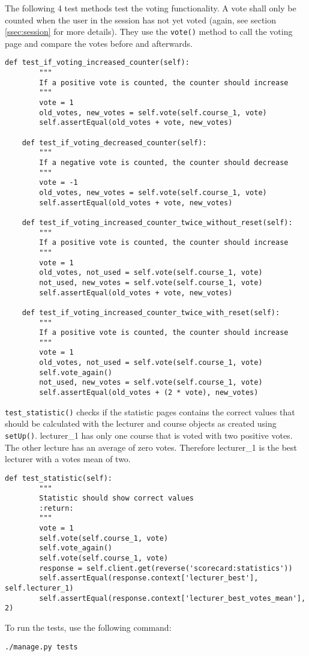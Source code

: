 The following 4 test methods test the voting functionality. A vote shall only be counted when the user in the session has not yet voted (again, see section \ref{ssec:session} for more details). They use the \lstinline|vote()| method to call the voting page and compare the votes before and afterwards.

\begin{lstlisting}[style=Python, caption=Exceprt from scorecard/tests.py, label=lst:tests.py]
    def test_if_voting_increased_counter(self):
        """
        If a positive vote is counted, the counter should increase
        """
        vote = 1
        old_votes, new_votes = self.vote(self.course_1, vote)
        self.assertEqual(old_votes + vote, new_votes)

    def test_if_voting_decreased_counter(self):
        """
        If a negative vote is counted, the counter should decrease
        """
        vote = -1
        old_votes, new_votes = self.vote(self.course_1, vote)
        self.assertEqual(old_votes + vote, new_votes)

    def test_if_voting_increased_counter_twice_without_reset(self):
        """
        If a positive vote is counted, the counter should increase
        """
        vote = 1
        old_votes, not_used = self.vote(self.course_1, vote)
        not_used, new_votes = self.vote(self.course_1, vote)
        self.assertEqual(old_votes + vote, new_votes)

    def test_if_voting_increased_counter_twice_with_reset(self):
        """
        If a positive vote is counted, the counter should increase
        """
        vote = 1
        old_votes, not_used = self.vote(self.course_1, vote)
        self.vote_again()
        not_used, new_votes = self.vote(self.course_1, vote)
        self.assertEqual(old_votes + (2 * vote), new_votes)
\end{lstlisting}

\lstinline|test_statistic()| checks if the statistic pages contains the correct values that should be calculated with the lecturer and course objects as created using \lstinline|setUp()|. lecturer\_1 has only one course that is voted with two positive votes. The other lecture has an average of zero votes. Therefore lecturer\_1 is the best lecturer with a votes mean of two.

\begin{lstlisting}[style=Python, caption=Exceprt from scorecard/tests.py, label=lst:tests.py]
    def test_statistic(self):
        """
        Statistic should show correct values
        :return:
        """
        vote = 1
        self.vote(self.course_1, vote)
        self.vote_again()
        self.vote(self.course_1, vote)
        response = self.client.get(reverse('scorecard:statistics'))
        self.assertEqual(response.context['lecturer_best'], self.lecturer_1)
        self.assertEqual(response.context['lecturer_best_votes_mean'], 2)
\end{lstlisting}

To run the tests, use the following command:
\begin{lstlisting}[style=Bash, caption=Run tests, label=lst:run_tests]
./manage.py tests
\end{lstlisting}